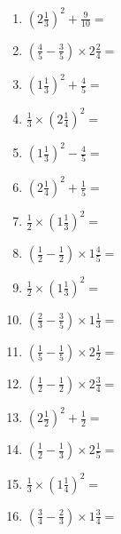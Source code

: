 \documentclass[12pt]{article}
\begin{document}
\begin{enumerate}
\newpage
\item \large $ \left( 2 \frac{1}{3} \right)^2 + \frac{9}{10} = $ \vspace{1.6cm}
\item \large $ \left( \frac{4}{5} - \frac{3}{5} \right) \times 2 \frac{2}{4} = $ \vspace{1.6cm}
\item \large $ \left( 1 \frac{1}{3} \right)^2 + \frac{4}{5} = $ \vspace{1.6cm}
\item \large $ \frac{1}{3} \times \left( 2 \frac{1}{4} \right)^2 = $ \vspace{1.6cm}
\item \large $ \left( 1 \frac{1}{3} \right)^2 - \frac{4}{5} = $ \vspace{1.6cm}
\item \large $ \left( 2 \frac{1}{4} \right)^2 + \frac{1}{5} = $ \vspace{1.6cm}
\item \large $ \frac{1}{2} \times \left( 1 \frac{1}{3} \right)^2 = $ \vspace{1.6cm}
\item \large $ \left( \frac{1}{2} - \frac{1}{2} \right) \times 1 \frac{4}{5} = $ \vspace{1.6cm}
\item \large $ \frac{1}{2} \times \left( 1 \frac{1}{3} \right)^2 = $ \vspace{1.6cm}
\item \large $ \left( \frac{2}{3} - \frac{3}{5} \right) \times 1 \frac{1}{3} = $ \vspace{1.6cm}
\newpage
\item \large $ \left( \frac{1}{5} - \frac{1}{5} \right) \times 2 \frac{1}{2} = $ \vspace{1.6cm}
\item \large $ \left( \frac{1}{2} - \frac{1}{2} \right) \times 2 \frac{3}{4} = $ \vspace{1.6cm}
\item \large $ \left( 2 \frac{1}{2} \right)^2 + \frac{1}{2} = $ \vspace{1.6cm}
\item \large $ \left( \frac{1}{2} - \frac{1}{3} \right) \times 2 \frac{1}{5} = $ \vspace{1.6cm}
\item \large $ \frac{1}{3} \times \left( 1 \frac{1}{4} \right)^2 = $ \vspace{1.6cm}
\item \large $ \left( \frac{3}{4} - \frac{2}{3} \right) \times 1 \frac{3}{4} = $ \vspace{1.6cm}

\end{enumerate}
\end{document}

